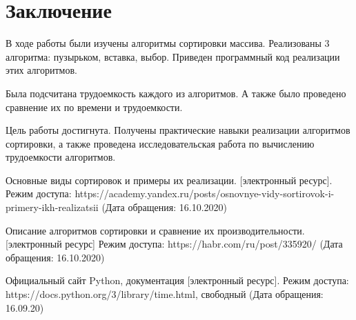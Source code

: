 \documentclass[12pt]{report}
\begin{document}
\chapter*{Заключение}

В ходе работы были изучены алгоритмы сортировки массива. Реализованы 3 алгоритма: пузырьком, вставка, выбор. Приведен программный код реализации этих алгоритмов.

Была подсчитана трудоемкость каждого из алгоритмов. А также было проведено сравнение их по времени и трудоемкости.

Цель работы достигнута. Получены практические навыки реализации алгоритмов сортировки, а также проведена исследовательская работа по вычислению трудоемкости алгоритмов.


\begin{thebibliography}{2}
	 Основные виды сортировок и примеры их реализации. [электронный ресурс]. Режим доступа: https://academy.yandex.ru/posts/osnovnye-vidy-sortirovok-i-primery-ikh-realizatsii
	(Дата обращения: 16.10.2020)
	
	 Описание алгоритмов сортировки и сравнение их производительности. [электронный ресурс] Режим доступа:
	https://habr.com/ru/post/335920/
	(Дата обращения: 16.10.2020)
	
	 Официальный сайт Python, документация [электронный ресурс]. Режим доступа: https://docs.python.org/3/library/time.html, свободный (Дата обращения: 16.09.20)
	
\end{thebibliography}
\end{document}

